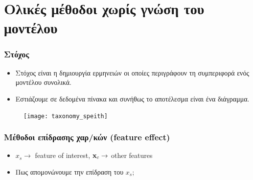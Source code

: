 \section{Ολικές μέθοδοι χωρίς γνώση του μοντέλου}

\begin{frame}
  \frametitle{Στόχος}
  \begin{itemize}
  \item Στόχος είναι η δημιουργία ερμηνειών οι οποίες περιγράφουν τη συμπεριφορά
    ενός μοντέλου συνολικά.
  \item Εστιάζουμε σε δεδομένα πίνακα και συνήθως το αποτέλεσμα είναι ένα
    διάγραμμα.
  \end{itemize}
  \begin{figure}
    \texttt{[image: taxonomy\_speith]}
  \end{figure}
\end{frame}

\begin{frame}
  \frametitle{Μέθοδοι επίδρασης χαρ/κών (feature effect)}
  \begin{itemize}
  \item \(x_s \rightarrow \) feature of interest, \(\mathbf{x}_c \rightarrow\) other features
  \item Πως απομονώνουμε την επίδραση του \(x_s\);
  \end{itemize}
\end{frame}

